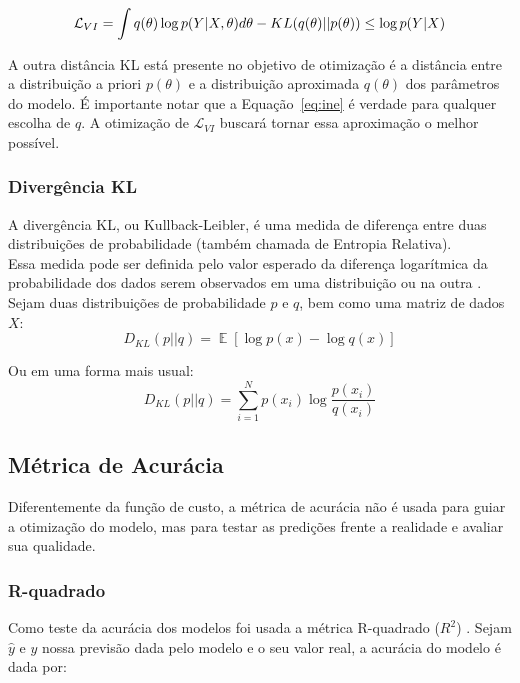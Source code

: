 \begin{equation}
  \label {eq:ine}
  \mathcal{L}_{VI} = \int q(\theta) \log p(Y | X,\theta)d\theta - \mathnormal{KL}(q(\theta) ||p(\theta)) \\
                  \leq \log p(Y|X)
\end{equation}

A outra distância KL está presente no objetivo de otimização é a
distância entre a distribuição a priori $p(\theta)$ e a distribuição aproximada
$q(\theta)$ dos parâmetros do modelo. É importante notar que a Equação~\ref{eq:ine} é verdade para qualquer escolha de
$q$. A otimização de $\mathcal{L}_{VI}$ buscará tornar essa aproximação o melhor possível.



\subsubsection{Divergência KL}

A divergência KL, ou Kullback-Leibler, é uma medida de diferença entre duas distribuições de probabilidade (também chamada de Entropia Relativa). \\
Essa medida pode ser definida pelo valor esperado da diferença logarítmica da probabilidade dos dados serem observados em uma distribuição ou na outra \citep{dlbook}. \\
Sejam duas distribuições de probabilidade $p$ e $q$, bem como uma matriz de dados $X$: \\

\[D_{KL}(p || q) = \mathop{\mathbb{E}}[\log p(x) - \log q(x)]​\]

Ou em uma forma mais usual: \\

\[D_{KL}(p||q) = \sum_{i=1}^{N}p(x_{i}) \log \frac{p(x_{i})}{q(x_{i})}​\]



\subsection{Métrica de Acurácia}

Diferentemente da função de custo, a métrica de acurácia não é usada para guiar a otimização do modelo,
mas para testar as predições frente a realidade e avaliar sua qualidade. \\

\subsubsection{R-quadrado}
Como teste da acurácia dos modelos foi usada a métrica R-quadrado ($R^2$) \citep{cohen}. Sejam $\hat{y}$ e $y$ nossa previsão dada pelo modelo e o seu valor real, a acurácia do modelo é dada por:\\

